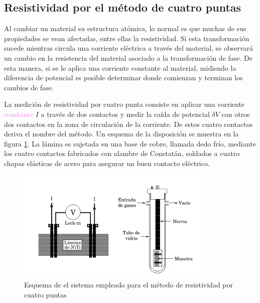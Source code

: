 \documentclass[12pt]{article}
\theoremstyle{definition}
\theoremstyle{remark}
\begin{document}
{\subsection{Resistividad por el método de cuatro puntas}


Al cambiar un material su estructura atómica, lo normal es que muchas de sus propiedades se vean afectadas, entre ellas la resistividad. Si esta transformación sucede mientras circula una corriente eléctrica a través del material, se observará un cambio en la resistencia del material asociado a la transformación de fase. De esta manera, si se le aplica una corriente constante al material, midiendo la diferencia de potencial es posible determinar donde comienzan y terminan los cambios de fase.


La medición de resistividad por cuatro punta consiste en aplicar una corriente \textcolor{violet}{constante} $I$ a través de dos contactos y medir  la caída de potencial $\delta V$ con otros dos contactos en la zona de circulación de la corriente. De estos cuatro contactos deriva el nombre del método. Un esquema de la disposición se muestra en la figura \ref{4puntas}. La lámina es sujetada en una base de cobre, llamada dedo frío, mediante los cuatro contactos fabricados con alambre de Constatán, soldados a cuatro chapas elásticas de acero para asegurar un buen contacto eléctrico.

 \begin{figure}[H]
 	\centering
	\includegraphics[scale=1]{img/r4puntas.png}
 	\caption{Esquema de el sistema empleado para el método de resistividad por  cuatro puntas}
	\label{4puntas}
\end{figure} 

}
\end{document}
